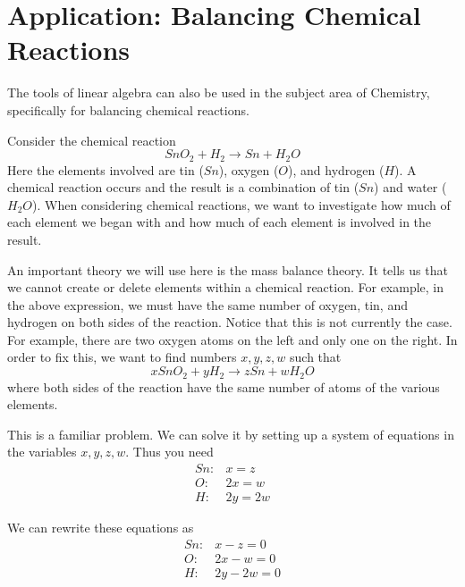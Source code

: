 \section{Application: Balancing Chemical Reactions}

The tools of linear algebra can also be used in the subject area of Chemistry, specifically for balancing chemical reactions. 

Consider the chemical reaction 
\begin{equation*}
SnO_{2}+H_{2}\rightarrow Sn+H_{2}O
\end{equation*}
Here the elements involved are tin ($Sn$), oxygen ($O$), and hydrogen ($H$). A
chemical reaction occurs and the result is a combination of tin ($Sn$) and water ($H_{2}O$). When considering
chemical reactions, we want to investigate how much of each element we began with and how much of each element is involved in the result.

An important theory we will use here is the mass balance theory. It tells us that we cannot create or delete 
elements within a chemical reaction. For example, in the above expression, we must have the same number of oxygen, tin,
and hydrogen on both sides of the reaction. Notice that this is not currently the case.
 For example, there are two oxygen atoms on the left and only one
on the right. In order to fix this, we want to find numbers $x,y,z,w$ such that 
\begin{equation*}
xSnO_{2}+yH_{2}\rightarrow zSn+wH_{2}O
\end{equation*}
where both sides of the reaction have the same number of atoms of the various elements. 

This is a familiar problem. We can solve it by setting up a system of equations 
in the variables $x,y,z,w$. Thus you need 
\begin{equation*}
\begin{array}{cl}
Sn: & x=z \\ 
O: & 2x=w \\ 
H: & 2y=2w
\end{array}
\end{equation*}

We can rewrite these equations as
\begin{equation*}
\begin{array}{cl}
Sn: & x - z = 0 \\ 
O: & 2x - w = 0 \\ 
H: & 2y - 2w = 0 
\end{array}
\end{equation*}

